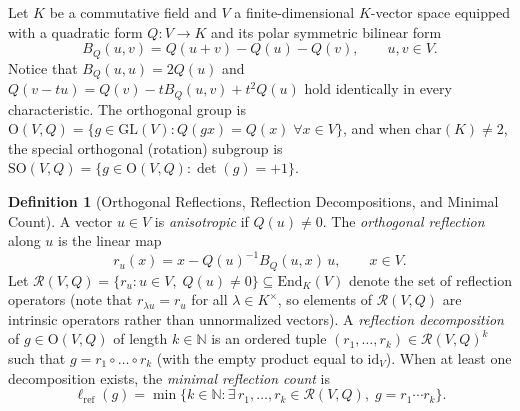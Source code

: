 \documentclass[11pt,a4paper]{article}
\theoremstyle{plain}
\theoremstyle{definition}
\newtheorem{definition}[theorem]{Definition}
\newcommand{\N}{\mathbb{N}}
\newcommand{\Orth}{\mathrm{O}}
\newcommand{\SO}{\mathrm{SO}}
\newcommand{\Refl}{\mathcal{R}}
\newcommand{\lref}{\ell_{\mathrm{ref}}}
\begin{document}
Let $K$ be a commutative field and $V$ a finite-dimensional $K$-vector space equipped with a quadratic form $Q : V \to K$ and its polar symmetric bilinear form
\begin{equation}\label{eq:polar}
  B_Q(u, v) = Q(u + v) - Q(u) - Q(v), \qquad u, v \in V.
\end{equation}
Notice that $B_Q(u, u) = 2 Q(u)$ and $Q(v - t u) = Q(v) - t B_Q(u, v) + t^2 Q(u)$ hold identically in every characteristic. The orthogonal group is $\Orth(V, Q) = \{g \in \mathrm{GL}(V) : Q(g x) = Q(x) \;\forall x \in V\}$, and when $\mathrm{char}(K) \neq 2$, the special orthogonal (rotation) subgroup is $\SO(V, Q) = \{g \in \Orth(V, Q) : \det(g) = +1\}$.

\begin{definition}[Orthogonal Reflections, Reflection Decompositions, and Minimal Count]
\label{def:refl}
A vector $u \in V$ is \emph{anisotropic} if $Q(u) \neq 0$. The \emph{orthogonal reflection} along $u$ is the linear map
\begin{equation}\label{eq:refl}
  r_u(x) = x - Q(u)^{-1} B_Q(u, x)\, u, \qquad x \in V.
\end{equation}
Let $\Refl(V, Q) = \{r_u : u \in V,\; Q(u) \neq 0\} \subseteq \mathrm{End}_K(V)$ denote the set of reflection operators (note that $r_{\lambda u} = r_u$ for all $\lambda \in K^\times$, so elements of $\Refl(V, Q)$ are intrinsic operators rather than unnormalized vectors). A \emph{reflection decomposition} of $g \in \Orth(V, Q)$ of length $k \in \N$ is an ordered tuple $(r_1, \dots, r_k) \in \Refl(V, Q)^k$ such that $g = r_1 \circ \dots \circ r_k$ (with the empty product equal to $\mathrm{id}_V$). When at least one decomposition exists, the \emph{minimal reflection count} is
\[
  \lref(g) = \min\bigl\{k \in \N : \exists\, r_1, \dots, r_k \in \Refl(V, Q),\; g = r_1 \cdots r_k\bigr\}.
\]
\end{definition}
\end{document}
